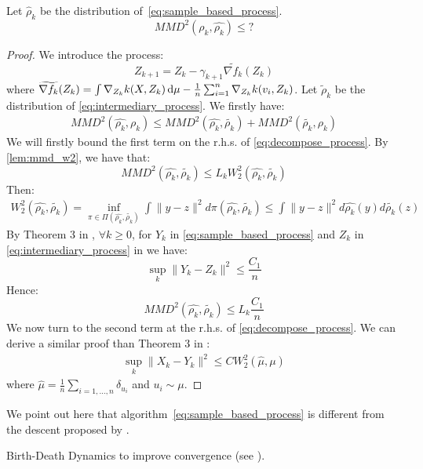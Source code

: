 \begin{proposition} Let $\widehat{\rho}_k$ be the distribution of~\eqref{eq:sample_based_process}.
	\begin{equation}
	MMD^2(\rho_k,\widehat{\rho_k})\le ?
	\end{equation}
\end{proposition}
\begin{proof}
	We introduce the process:
	\begin{equation}\label{eq:intermediary_process}
	Z_{k+1}=Z_k-\gamma_{k+1}\widetilde{\nabla f_k}(Z_k) 
	\end{equation}
	where $\widetilde{\nabla f_k}(Z_k)=\int \nabla_{Z_k}k(X,Z_k)\mathop{}\!\mathrm{d} \mu- \frac{1}{n}\sum_{i=1}^{n}\nabla_{Z_k}k(v_i,Z_k)$. Let $\widetilde{\rho}_k$ be the distribution of \eqref{eq:intermediary_process}. We firstly have:
	\begin{align}\label{eq:decompose_process}
	MMD^2(\widehat{\rho_k}, \rho_k) \le MMD^2(\widehat{\rho_k}, \widetilde{\rho_k})+ MMD^2(\widetilde{\rho_k}, \rho_k)
	\end{align}
	 We will firstly bound the first term on the r.h.s. of \eqref{eq:decompose_process}. By \cref{lem:mmd_w2}, we have that:
	 \begin{equation}
	 MMD^2(\widehat{\rho_k}, \widetilde{\rho_k})\le L_k W_2^2(\widehat{\rho_k}, \widetilde{\rho_k})
	 \end{equation}
	 Then:
	 \begin{align}
	 W_2^2(\widehat{\rho_k}, \widetilde{\rho_k}) = \inf_{\pi \in \Pi(\widehat{\rho_k}, \widetilde{\rho_k})} \int \| y-z \|^2 d\pi(\widehat{\rho_k}, \widetilde{\rho_k}) \le \int \|y-z\|^2 d\widehat{\rho_k}(y)d\widetilde{\rho_k}(z)
	 \end{align}
	 By Theorem 3 in \cite{jourdain2007nonlinear}, $\forall k\ge 0$, for $Y_k$ in \eqref{eq:sample_based_process} and $Z_k$ in \eqref{eq:intermediary_process} in we have:	  
	 \begin{equation}
	 \sup_{k}\| Y_k - Z_k\|^2\le \frac{C_1}{n}
	 \end{equation}
	 Hence:
	 \begin{equation}
	 MMD^2(\widehat{\rho_k}, \widetilde{\rho_k})\le L_k \frac{C_1}{n}
	 \end{equation}
	We now turn to the second term at the r.h.s. of \eqref{eq:decompose_process}. We can derive a similar proof than Theorem 3 in \cite{jourdain2007nonlinear}:
	 \begin{align}
	 \sup_{k}\|X_k-Y_k\|^2 \le C W_2^2(\widehat{\mu},\mu)
	 \end{align}
	where $\widehat{\mu}=\frac{1}{n}\sum_{i=1, \dots,n}\delta_{u_i}$ and $u_i \sim \mu$. 
\end{proof}

\begin{remark}
	We point out here that algorithm~\eqref{eq:sample_based_process} is different from the descent proposed by \cite{mroueh2018regularized}. 
\end{remark}

\begin{remark}
	Birth-Death Dynamics to improve convergence (see \cite{rotskoff2019global}).
\end{remark}
